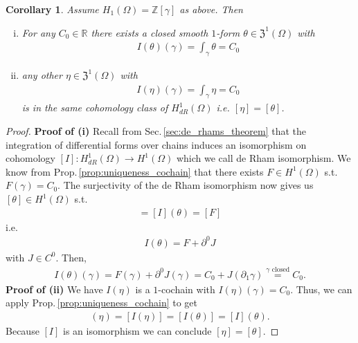 \documentclass[12pt,a4paper]{article}
\numberwithin{equation}{subsection}
\numberwithin{lemma}{subsection}
\newtheorem{corollary}[lemma]{Corollary}
\theoremstyle{definition}
\newcommand{\integers}{\mathbb{Z}}
\newcommand{\real}{\mathbb{R}}
\begin{document}
\begin{corollary}\label{cor:existence_uniqueness_1form}
    Assume $H_1(\Omega) = \integers [\gamma]$ as above. Then
    \begin{enumerate}[(i)]
        \item For any $C_0 \in \real$ there exists a closed smooth $1$-form 
            $\theta \in \mathfrak{Z}^1(\Omega)$ with 
            \begin{align*}
                I(\theta)(\gamma) = \int_\gamma \theta = C_0
            \end{align*}
        \item any other $\eta \in \mathfrak{Z}^1(\Omega)$ with 
            \begin{align*}
                I(\eta)(\gamma) = \int_\gamma \eta = C_0
            \end{align*}
            is in the same cohomology class of $H_{dR}^1(\Omega)$ 
            i.e. $[\eta] = [\theta]$.
    \end{enumerate}
\end{corollary}
\begin{proof}
    \textbf{Proof of (i)}
    Recall from Sec.\,\ref{sec:de_rhams_theorem} 
    that the integration of differential forms 
    over chains induces an isomorphism on cohomology 
    $[I]: H_{dR}^1(\Omega) \rightarrow H^1(\Omega)$ which we call 
    de Rham isomorphism. We know from 
    Prop.\,\ref{prop:uniqueness_cochain} that there exists $F\in H^1(\Omega)$ 
    s.t. $F(\gamma) = C_0$. The surjectivity of the de Rham isomorphism 
    now gives us $[\theta] \in H^1(\Omega)$ s.t.
    \begin{align*}
        [I(\theta)] = [I](\theta) = [F]
    \end{align*}
    i.e.
    \begin{align*}
        I(\theta) = F + \partial^0 J
    \end{align*}
    with $J \in C^0$. Then, 
    \begin{align*}
        I(\theta)(\gamma) = F(\gamma) + \partial^0 J(\gamma) 
        = C_0 + J(\partial_1 \gamma) 
        \stackrel{\text{$\gamma$ closed}}{=} C_0. 
    \end{align*}
    \textbf{Proof of (ii)}
    We have $I(\eta)$ is a $1$-cochain with $I(\eta)(\gamma) = C_0$.
    Thus, we can apply Prop.\,\ref{prop:uniqueness_cochain} to get
    \begin{align*}
        [I](\eta)=[I(\eta)] = [I(\theta)]=[I](\theta).
    \end{align*}
    Because $[I]$ is an isomorphism we can conclude $[\eta] = [\theta]$.
\end{proof}
\end{document}
